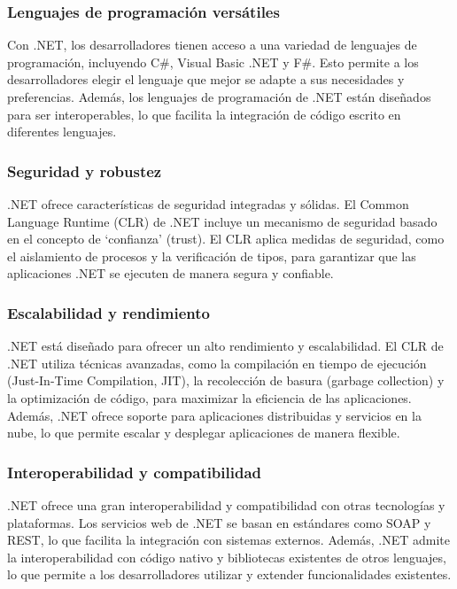 \documentclass[executivepaper]{article}
\begin{document}
\subsubsection*{Lenguajes de programación versátiles}
Con .NET, los desarrolladores tienen acceso a una variedad de lenguajes de programación, incluyendo C\#, Visual Basic .NET y F\#. Esto permite a los desarrolladores elegir el lenguaje que mejor se adapte a sus necesidades y preferencias. Además, los lenguajes de programación de .NET están diseñados para ser interoperables, lo que facilita la integración de código escrito en diferentes lenguajes.

\subsubsection*{Seguridad y robustez}
.NET ofrece características de seguridad integradas y sólidas. El Common Language Runtime (CLR) de .NET incluye un mecanismo de seguridad basado en el concepto de \enquote*{confianza} (trust). El CLR aplica medidas de seguridad, como el aislamiento de procesos y la verificación de tipos, para garantizar que las aplicaciones .NET se ejecuten de manera segura y confiable.

\subsubsection*{Escalabilidad y rendimiento}
.NET está diseñado para ofrecer un alto rendimiento y escalabilidad. El CLR de .NET utiliza técnicas avanzadas, como la compilación en tiempo de ejecución (Just-In-Time Compilation, JIT), la recolección de basura (garbage collection) y la optimización de código, para maximizar la eficiencia de las aplicaciones. Además, .NET ofrece soporte para aplicaciones distribuidas y servicios en la nube, lo que permite escalar y desplegar aplicaciones de manera flexible.

\subsubsection*{Interoperabilidad y compatibilidad}
.NET ofrece una gran interoperabilidad y compatibilidad con otras tecnologías y plataformas. Los servicios web de .NET se basan en estándares como SOAP y REST, lo que facilita la integración con sistemas externos. Además, .NET admite la interoperabilidad con código nativo y bibliotecas existentes de otros lenguajes, lo que permite a los desarrolladores utilizar y extender funcionalidades existentes.
\end{document}
